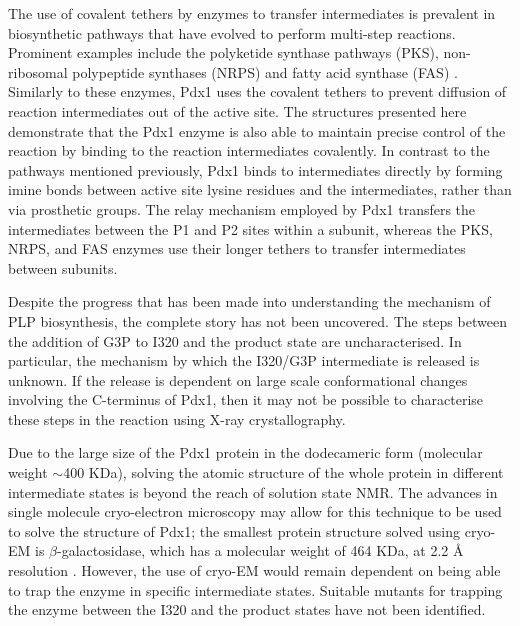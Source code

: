 The use of covalent tethers by enzymes to transfer intermediates is prevalent in biosynthetic pathways that have evolved to perform multi-step reactions. Prominent examples include the polyketide synthase pathways (PKS), non-ribosomal polypeptide synthases (NRPS) and fatty acid synthase (FAS) \cite{Wu2001,Tanovic2008,Jenni2007}. Similarly to these enzymes, Pdx1 uses the covalent tethers to prevent diffusion of reaction intermediates out of the active site. The structures presented here demonstrate that the Pdx1 enzyme is also able to maintain precise control of the reaction by binding to the reaction intermediates covalently. In contrast to the pathways mentioned previously, Pdx1 binds to intermediates directly by forming imine bonds between active site lysine residues and the intermediates, rather than via prosthetic groups. The relay mechanism employed by Pdx1 transfers the intermediates between the P1 and P2 sites within a subunit, whereas the PKS, NRPS, and FAS enzymes use their longer tethers to transfer intermediates between subunits.

Despite the progress that has been made into understanding the mechanism of PLP biosynthesis, the complete story has not been uncovered. The steps between the addition of G3P to I320 and the product state are uncharacterised. In particular, the mechanism by which the I320/G3P intermediate is released is unknown. If the release is dependent on large scale conformational changes involving the C-terminus of Pdx1, then it may not be possible to characterise these steps in the reaction using X-ray crystallography. 

Due to the large size of the Pdx1 protein in the dodecameric form (molecular weight $\sim$400 KDa), solving the atomic structure of the whole protein in different intermediate states is beyond the reach of solution state NMR. The advances in single molecule cryo-electron microscopy may allow for this technique to be used to solve the structure of Pdx1; the smallest protein structure solved using cryo-EM is $\beta$-galactosidase, which has a molecular weight of 464 KDa, at 2.2 \si{\angstrom} resolution \cite{Bartesaghi2015}. However, the use of cryo-EM would remain dependent on being able to trap the enzyme in specific intermediate states. Suitable mutants for trapping the enzyme between the I320 and the product states have not been identified.  

